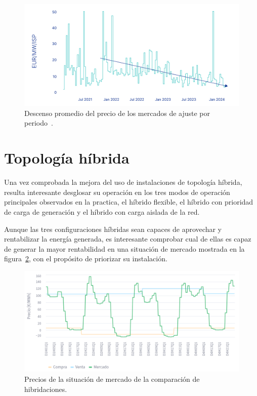 \begin{figure}
  \centering
  \includegraphics[width=0.75\linewidth]{figures/fcr-price.jpg}
  \caption[Descenso promedio del precio de los mercados de ajuste por periodo.]{Descenso promedio del precio de los mercados de ajuste por periodo~\cite{leal2025case}.}%
  \label{fig:fcr-price}
\end{figure}

\section{Topología híbrida}%
\label{makereference7.4}

Una vez comprobada la mejora del uso de instalaciones de topología híbrida, resulta interesante desglosar su operación en los tres modos de operación principales observados en la practica, el híbrido flexible, el híbrido con prioridad de carga de generación y el híbrido con carga aislada de la red.

Aunque las tres configuraciones híbridas sean capaces de aprovechar y rentabilizar la energía generada, es interesante comprobar cual de ellas es capaz de generar la mayor rentabilidad en una situación de mercado mostrada en la figura~\ref{fig:precios-hibridaciones}, con el propósito de priorizar su instalación.

\begin{figure}
  \centering
  \includegraphics[width=0.75\linewidth]{figures/precios-hibridaciones.png}
  \caption[Precios de la situación de mercado de la comparación de hibridaciones.]{Precios de la situación de mercado de la comparación de hibridaciones.}%
  \label{fig:precios-hibridaciones}
\end{figure}

